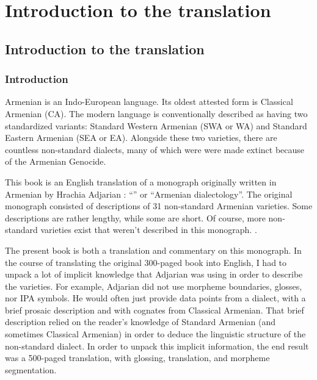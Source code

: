 \part{Introduction to the translation}





\chapter{Introduction to the translation}\label{chapter:HossepIntro}


\section{Introduction}

Armenian is an Indo-European language. Its oldest attested form is Classical Armenian (CA). The modern language is conventionally described as having two standardized variants: Standard Western Armenian (SWA or WA) and Standard Eastern Armenian (SEA or EA). Alongside these two varieties, there are countless non-standard dialects, many of which were were made extinct because of the Armenian Genocide. 

This book is an English translation of a monograph originally written in Armenian by Hrachia Adjarian \citep{Adjarian-1911-DialectologyBook}: ``'' or ``Armenian dialectology''. The original monograph consisted of descriptions of 31 non-standard Armenian varieties. Some descriptions are rather lengthy, while some are short.  Of course, more non-standard varieties exist that weren't described in this monograph.  \citep{GreppinKhachaturian-1986-HandbookArmenianDialectology,Martirosyan-2019-Armeniandialects,Martirosyan-2019-ArmenianDialectsBigVersionRussianJournal,DolatianEtAl-prep-IranianGrammar}.

The present book is both a translation and commentary on this monograph. In the course of translating the original 300-paged book into English, I had to unpack a lot of implicit knowledge that Adjarian was using in order to describe the varieties. For example, Adjarian did not use morpheme boundaries, glosses, nor IPA symbols. He would often just provide data points from a dialect, with a brief prosaic description and with cognates from Classical Armenian. That brief description relied on the reader's knowledge of Standard Armenian (and sometimes Classical Armenian) in order to deduce the linguistic structure of the non-standard dialect. In order to unpack this implicit information, the end result was a 500-paged translation, with glossing, translation, and morpheme segmentation.


